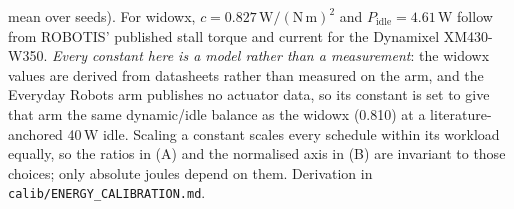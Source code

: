 {mean over seeds). For widowx, $c = 0.827\,\mathrm{W/(N\,m)^2}$ and
$P_{\mathrm{idle}} = 4.61$\,W follow from ROBOTIS' published stall torque and
current for the Dynamixel XM430-W350. \emph{Every constant here is a model rather
than a measurement}: the widowx values are derived from datasheets rather than
measured on the arm, and the Everyday Robots arm publishes no actuator data, so
its constant is set to give that arm the same dynamic/idle balance as the widowx
(0.810) at a literature-anchored 40\,W idle. Scaling a constant scales every
schedule within its workload equally, so the ratios in (A) and the normalised
axis in (B) are invariant to those choices; only absolute joules depend on them.
Derivation in \texttt{calib/ENERGY\_CALIBRATION.md}.}
